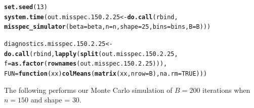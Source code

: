 \documentclass[11pt]{article}\usepackage[]{graphicx}\usepackage[]{color}
\makeatletter
\newcommand{\hlnum}[1]{\textcolor[rgb]{0.686,0.059,0.569}{#1}}%
\newcommand{\hlstd}[1]{\textcolor[rgb]{0.345,0.345,0.345}{#1}}%
\newcommand{\hlkwa}[1]{\textcolor[rgb]{0.161,0.373,0.58}{\textbf{#1}}}%
\newcommand{\hlkwb}[1]{\textcolor[rgb]{0.69,0.353,0.396}{#1}}%
\newcommand{\hlkwc}[1]{\textcolor[rgb]{0.333,0.667,0.333}{#1}}%
\newcommand{\hlkwd}[1]{\textcolor[rgb]{0.737,0.353,0.396}{\textbf{#1}}}%
\newenvironment{kframe}{%
 \def\at@end@of@kframe{}%
 \ifinner\ifhmode%
  \def\at@end@of@kframe{\end{minipage}}%
  \begin{minipage}{\columnwidth}%
 \fi\fi%
 \def\FrameCommand##1{\hskip\@totalleftmargin \hskip-\fboxsep
 \colorbox{shadecolor}{##1}\hskip-\fboxsep
     \hskip-\linewidth \hskip-\@totalleftmargin \hskip\columnwidth}%
 \MakeFramed {\advance\hsize-\width
   \@totalleftmargin\z@ \linewidth\hsize
   \@setminipage}}%
 {\par\unskip\endMakeFramed%
 \at@end@of@kframe}
\newenvironment{knitrout}{}{} %
\makeatother
\begin{document}
\begin{knitrout}
\color{fgcolor}\begin{kframe}
\begin{alltt}
\hlkwd{set.seed}\hlstd{(}\hlnum{13}\hlstd{)}
\hlkwd{system.time}\hlstd{(out.misspec.150.2.25} \hlkwb{<-} \hlkwd{do.call}\hlstd{(rbind,}
  \hlkwd{misspec_simulator}\hlstd{(}\hlkwc{beta} \hlstd{= beta,} \hlkwc{n} \hlstd{= n,} \hlkwc{shape} \hlstd{=} \hlnum{25}\hlstd{,} \hlkwc{bins} \hlstd{= bins,} \hlkwc{B} \hlstd{= B)))}
\end{alltt}


{\ttfamily\noindent\bfseries\color{errorcolor}{\#\# Error in chol.default(crossprod(x) + lambda[j] * diag(v)): the leading minor of order 5 is not positive definite}}

{\ttfamily\noindent\itshape\color{messagecolor}{\#\# Timing stopped at: 0.654 0 0.654}}\begin{alltt}
\hlstd{diagnostics.misspec.150.2.25} \hlkwb{<-} \hlkwd{do.call}\hlstd{(rbind,} \hlkwd{lapply}\hlstd{(}\hlkwd{split}\hlstd{(out.misspec.150.2.25,}
  \hlkwc{f} \hlstd{=} \hlkwd{as.factor}\hlstd{(}\hlkwd{rownames}\hlstd{(out.misspec.150.2.25))),}
  \hlkwc{FUN} \hlstd{=} \hlkwa{function}\hlstd{(}\hlkwc{xx}\hlstd{)} \hlkwd{colMeans}\hlstd{(}\hlkwd{matrix}\hlstd{(xx,} \hlkwc{nrow} \hlstd{= B),} \hlkwc{na.rm} \hlstd{=} \hlnum{TRUE}\hlstd{)))}
\end{alltt}


{\ttfamily\noindent\bfseries\color{errorcolor}{\#\# Error in split(out.misspec.150.2.25, f = as.factor(rownames(out.misspec.150.2.25))): object 'out.misspec.150.2.25' not found}}\end{kframe}
\end{knitrout}


The following performs our Monte Carlo simulation of $B = 200$ iterations 
when $n = 150$ and shape = $30$.
\end{document}
